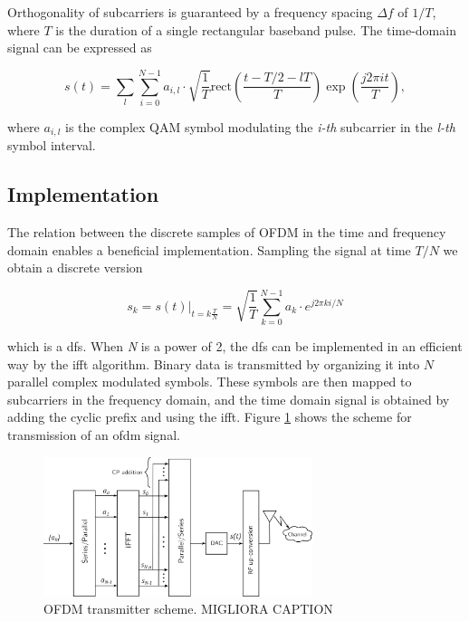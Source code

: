 Orthogonality of subcarriers is guaranteed by a frequency spacing $\Delta f$ of $1/T$, where $T$ is the duration of a single rectangular baseband pulse.
The time-domain signal can be expressed as

\begin{equation}
    s(t) = \sum_l\sum_{i=0}^{N-1} a_{i,l}\cdot \sqrt{\frac{1}{T}} \mathrm{rect} \left( \frac{t-T/2 - lT}{T} \right)\exp{\left(\frac{j2\pi it}{T}\right)},
\end{equation}

where $a_{i,l}$ is the complex QAM symbol modulating the \textit{i-th} subcarrier in the \textit{l-th} symbol interval.

\subsection{Implementation}
The relation between the discrete samples of OFDM in the time and frequency domain enables a beneficial implementation.
Sampling the signal at time $T/N$ we obtain a discrete version

\begin{equation}
    s_k = s(t)|_{t=k \frac{T}{N}} = \sqrt{\frac{1}{T}}\sum_{k=0}^{N-1} a_k \cdot e^{j2\pi ki/N}
\end{equation}

which is a \gls{dfs}. When \textit{N} is a power of 2, the \gls{dfs} can be implemented in an efficient way by the \gls{ifft} algorithm.
Binary data is transmitted by organizing it into $N$ parallel complex modulated symbols. These symbols are then mapped to subcarriers in the frequency domain, and the time domain signal is obtained by adding the cyclic prefix and using the \gls{ifft}. Figure \ref{fig:ofdm_transmit} shows the scheme for transmission of an \gls{ofdm} signal.

\begin{figure}[H]
	\centering
	\includegraphics[width=0.7\textwidth]{Images/theoretical/ofdm/ofdm_transmit.png}
	\caption{OFDM transmitter scheme. \alert{MIGLIORA CAPTION}}
	\label{fig:ofdm_transmit}
\end{figure}

